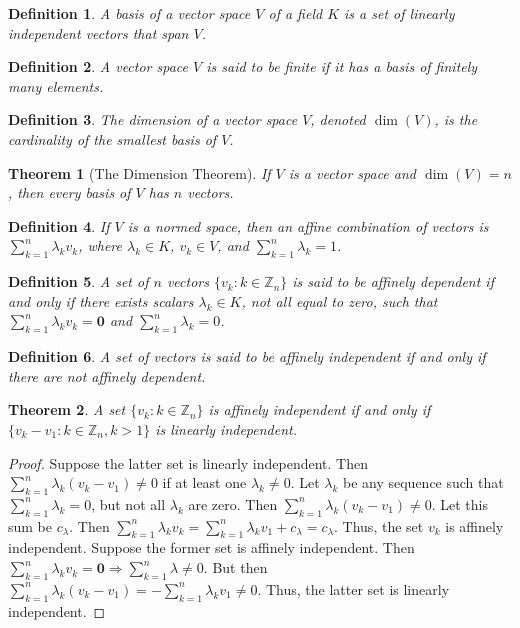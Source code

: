 \documentclass[oneside]{book}
\theoremstyle{mystyle}
\newtheorem{theorem}{Theorem}[section]
\newtheorem{definition}{Definition}[section]
\begin{document}
\begin{definition}
A basis of a vector space $V$ of a field $K$ is a set of linearly independent vectors that span $V$.
\end{definition}

\begin{definition}
A vector space $V$ is said to be finite if it has a basis of finitely many elements.
\end{definition}

\begin{definition}
The dimension of a vector space $V$, denoted $\dim(V)$, is the cardinality of the smallest basis of $V$.
\end{definition}

\begin{theorem}[The Dimension Theorem]
If $V$ is a vector space and $\dim(V)=n$, then every basis of $V$ has $n$ vectors.
\end{theorem}

\begin{definition}
If $V$ is a normed space, then an affine combination of vectors is $\sum_{k=1}^{n} \lambda_k v_k$, where $\lambda_k \in K$, $v_k \in V$, and $\sum_{k=1}^{n} \lambda_k = 1$.
\end{definition}

\begin{definition}
A set of $n$ vectors $\{v_k:k\in \mathbb{Z}_n\}$ is said to be affinely dependent if and only if there exists scalars $\lambda_k \in K$, not all equal to zero, such that $\sum_{k=1}^{n} \lambda_k v_k = \mathbf{0}$ and $\sum_{k=1}^{n} \lambda_k = 0$.
\end{definition}

\begin{definition}
A set of vectors is said to be affinely independent if and only if there are not affinely dependent.
\end{definition}

\begin{theorem}
A set $\{v_k:k\in \mathbb{Z}_n\}$ is affinely independent if and only if $\{v_k-v_1:k\in \mathbb{Z}_n, k>1\}$ is linearly independent.
\end{theorem}
\begin{proof}
Suppose the latter set is linearly independent. Then $\sum_{k=1}^{n} \lambda_k(v_k-v_1) \ne 0$ if at least one $\lambda_k \ne 0$. Let $\lambda_k$ be any sequence such that $\sum_{k=1}^{n} \lambda_k = 0$, but not all $\lambda_k$ are zero. Then $\sum_{k=1}^{n} \lambda_k(v_k-v_1)\ne 0$. Let this sum be $c_{\lambda}$. Then $\sum_{k=1}^{n} \lambda_k v_k = \sum_{k=1}^{n} \lambda_k v_1 + c_\lambda = c_{\lambda}$. Thus, the set $v_k$ is affinely independent. Suppose the former set is affinely independent. Then $\sum_{k=1}^{n} \lambda_k v_k = \mathbf{0} \Rightarrow \sum_{k=1}^{n} \lambda \ne 0$. But then $\sum_{k=1}^{n}\lambda_k (v_k-v_1) = - \sum_{k=1}^{n} \lambda_k v_1 \ne 0$. Thus, the latter set is linearly independent.
\end{proof}
\end{document}
